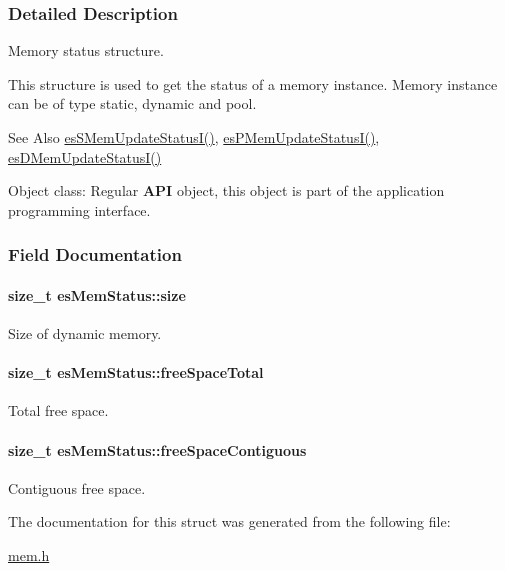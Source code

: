 \subsubsection{Detailed Description}
Memory status structure. 

This structure is used to get the status of a memory instance. Memory instance can be of type {\ttfamily static}, {\ttfamily dynamic} and {\ttfamily pool}. \begin{DoxySeeAlso}{See Also}
\hyperlink{group__mem__intf_ga87b817ce71357521c4cd43a9cb587201}{es\-S\-Mem\-Update\-Status\-I()}, \hyperlink{group__mem__intf_gab568f5b51f11f2bc315412c35bfc28e9}{es\-P\-Mem\-Update\-Status\-I()}, \hyperlink{group__mem__intf_gad1bddd779876d000f8906ec7ac747fa4}{es\-D\-Mem\-Update\-Status\-I()} 
\end{DoxySeeAlso}
\begin{DoxyParagraph}{Object class\-:}
Regular {\bfseries A\-P\-I} object, this object is part of the application programming interface. 
\end{DoxyParagraph}


\subsubsection{Field Documentation}
\hypertarget{structesMemStatus_a380e3d7b616ea3b5b2116c643616f170}{
\paragraph[{size}]{\setlength{\rightskip}{0pt plus 5cm}size\-\_\-t es\-Mem\-Status\-::size}}\label{structesMemStatus_a380e3d7b616ea3b5b2116c643616f170}


Size of dynamic memory. 

\hypertarget{structesMemStatus_a7e03e413141601c2486fd55e8d4c6daf}{
\paragraph[{free\-Space\-Total}]{\setlength{\rightskip}{0pt plus 5cm}size\-\_\-t es\-Mem\-Status\-::free\-Space\-Total}}\label{structesMemStatus_a7e03e413141601c2486fd55e8d4c6daf}


Total free space. 

\hypertarget{structesMemStatus_ab9abe5784bc4bb701ee759a2e02bfd8d}{
\paragraph[{free\-Space\-Contiguous}]{\setlength{\rightskip}{0pt plus 5cm}size\-\_\-t es\-Mem\-Status\-::free\-Space\-Contiguous}}\label{structesMemStatus_ab9abe5784bc4bb701ee759a2e02bfd8d}


Contiguous free space. 



The documentation for this struct was generated from the following file\-:\begin{DoxyCompactItemize}
\item 
\hyperlink{mem_8h}{mem.\-h}\end{DoxyCompactItemize}
